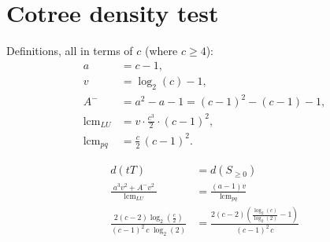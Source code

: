 \documentclass{article}
\begin{document}
\section*{Cotree density test}

Definitions, all in terms of $c$ (where $c \ge 4$):
\begin{align*}
  a &= c - 1, \\
  v &= \log_2(c) - 1, \\
  A^- &= a^2 - a - 1 = (c-1)^2 - (c-1) - 1, \\
  \text{lcm}_{LU} &= v \cdot \frac{c^3}{2} \cdot (c-1)^2, \\
  \text{lcm}_{pq} &= \frac{c}{2}\,(c-1)^2.
\end{align*}

\begin{align}
        d(tT)&=d(S_{\ge0}) \nonumber \\
        \frac{\;a^3v^2+A^-v^2\;}{\text{lcm}_{LU}}&=
        \frac{(a-1)v}{{\text{lcm}_{pq}}} \nonumber \\
        \frac{2(c-2)\log_2(\frac{c}{2})}{(c-1)^2\,c\; { \log_2(2)}}&=
        \frac{2(c-2)(\frac{\log_2(c)}{\log_2(2)}-1)}{(c-1)^2\, c }
\end{align}
\end{document}
